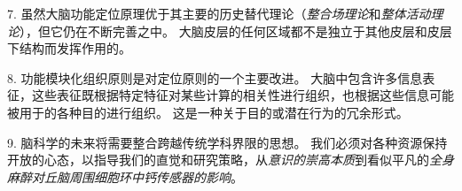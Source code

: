 7. 虽然大脑功能定位原理优于其主要的历史替代理论（\textit{整合场理论}和\textit{整体活动理论}），但它仍在不断完善之中。
大脑皮层的任何区域都不是独立于其他皮层和皮层下结构而发挥作用的。


8. 功能模块化组织原则是对定位原则的一个主要改进。
大脑中包含许多信息表征，这些表征既根据特定特征对某些计算的相关性进行组织，也根据这些信息可能被用于的各种目的进行组织。
这是一种关于目的或潜在行为的冗余形式。


9. 脑科学的未来将需要整合跨越传统学科界限的思想。
我们必须对各种资源保持开放的心态，以指导我们的直觉和研究策略，从\textit{意识的崇高本质}到看似平凡的\textit{全身麻醉对丘脑周围细胞环中钙传感器的影响}。



















